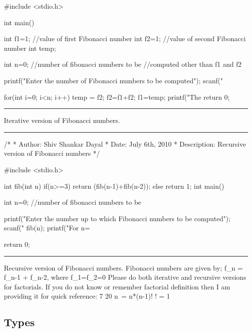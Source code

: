 #include <stdio.h>

int main()
{
  int f1=1;  //value of first Fibonacci number
  int f2=1;  //value of second Fibonacci number
  int temp;

  int n=0;  //number of fibonacci numbers to be
            //computed other than f1 and f2

  printf("Enter the number of Fibonacci numbers to be computed\n");
  scanf("%

  for(int i=0; i<n; i++)
    {
      temp = f2;
      f2=f1+f2;
      f1=temp;
      printf("The %
    }
  return 0;
}	
\stopCPP
{}
\hrule
\blank[force,1mm]
\startalignment[middle]
Iterative version of Fibonacci numbers.
\stopalignment
\blank[force,1mm]\hrule\blank[force,1mm]
\startCPP
/*
 * Author: Shiv Shankar Dayal
 * Date: July 6th, 2010
 * Description: Recursive version of Fibonacci numbers
 */

#include <stdio.h>

int fib(int n)
{
	if(n>=3)
	{
		return (fib(n-1)+fib(n-2));
	}
	else
	{
		return 1;
	}
}
int main()
{
	int n=0;   //number of fibonacci numbers to be

	printf("Enter the number up to which Fibonacci numbers to be computed\n");
	scanf("%
	fib(n);
	printf("For n=%

	return 0;
}
\stopCPP
{}
\hrule
\blank[force,1mm]
\startalignment[middle]
Recursive version of Fibonacci numbers.
\stopalignment
Fibonacci numbers are given by;
\startformula
f_n = f_{n-1} + f_{n-2}, where f_1=f_2=0
\stopformula
Please do both iterative and recursive versions for factorials. If you
do not know or remember factorial definition then I am providing it
for quick reference:
7 20
\startformula
n\ = n*(n-1)!\hfill\break
\stopformula
{}
! = 1
\stopformula

\subsection{Types}
